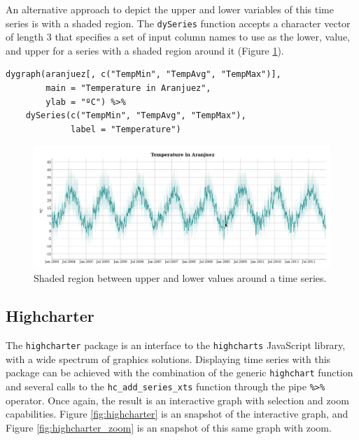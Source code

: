 \documentclass[smallroyalvopaper]{memoir}
\begin{document}
An alternative approach to depict the upper and lower variables of this time series is with a shaded region. The \texttt{dySeries} function accepts a character vector of length 3 that specifies a set of input column names to use as the lower, value, and upper for a series with a shaded region  around it (Figure \ref{fig:dygraphs_maxmin}).
\lstset{language=r,label= ,caption= ,captionpos=b,numbers=none}
\begin{lstlisting}
dygraph(aranjuez[, c("TempMin", "TempAvg", "TempMax")],
        main = "Temperature in Aranjuez",
        ylab = "ºC") %>%
    dySeries(c("TempMin", "TempAvg", "TempMax"),
             label = "Temperature")
\end{lstlisting}

\begin{figure}[htbp]
\centering
\includegraphics[width=.9\linewidth]{figs/dygraphs_aranjuez_maxmin.png}
\caption{Shaded region between upper and lower values around a time series. \label{fig:dygraphs_maxmin}}
\end{figure}

\subsection{Highcharter \label{sec:highcharter}}
\label{sec:orgc05f188}

The \texttt{highcharter} package is an interface to the \texttt{highcharts}
JavaScript library, with a wide spectrum of graphics
solutions. Displaying time series with this package can be achieved
with the combination of the generic \texttt{highchart} function and several
calls to the \texttt{hc\_add\_series\_xts} function through the pipe \texttt{\%>\%}
operator.  Once again, the result is an interactive graph with
selection and zoom capabilities. Figure \ref{fig:highcharter} is an
snapshot of the interactive graph, and Figure
\ref{fig:highcharter_zoom} is an snapshot of this same graph with
zoom.

\end{document}
